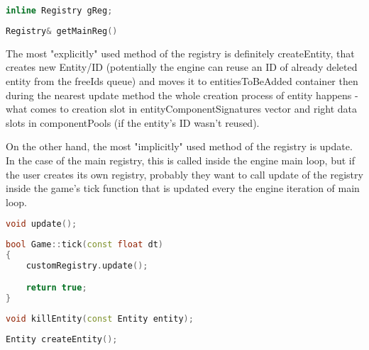 \begin{lstlisting}[language=c++, caption=Private method of access to the main registry (./tsengine/engine/src/globals.hpp)]
inline Registry gReg;
\end{lstlisting}

\begin{lstlisting}[language=c++, caption=Public method of access to the main registry (./tsengine/engine/src/globals.hpp)]
Registry& getMainReg()
\end{lstlisting}

The most "explicitly" used method of the registry is definitely createEntity, that creates new Entity/ID (potentially the engine can reuse an ID of already deleted entity from the freeIds queue) and moves it to entitiesToBeAdded container then during the nearest update method the whole creation process of entity happens - what comes to creation slot in entityComponentSignatures vector and right data slots in componentPools (if the entity's ID wasn't reused).

On the other hand, the most "implicitly" used method of the registry is update. In the case of the main registry, this is called inside the engine main loop, but if the user creates its own registry, probably they want to call update of the registry inside the game's tick function that is updated every the engine iteration of main loop.
\begin{lstlisting}[language=c++, caption=ECS Registry's update method (./engine/include/tsengine/ecs/ecs.h)]
    void update();
\end{lstlisting}

\begin{lstlisting}[language=c++, caption=An example of how custom registry should be updated]
bool Game::tick(const float dt)
{
    customRegistry.update();

    return true;
}
\end{lstlisting}

\begin{lstlisting}[language=c++, caption=Public method of access to the main registry (./tsengine/engine/src/globals.hpp)]
void killEntity(const Entity entity);
\end{lstlisting}

\begin{lstlisting}[language=c++, caption=Creation of the new Entity (./engine/include/tsengine/ecs/ecs.h)]
Entity createEntity();
\end{lstlisting}

